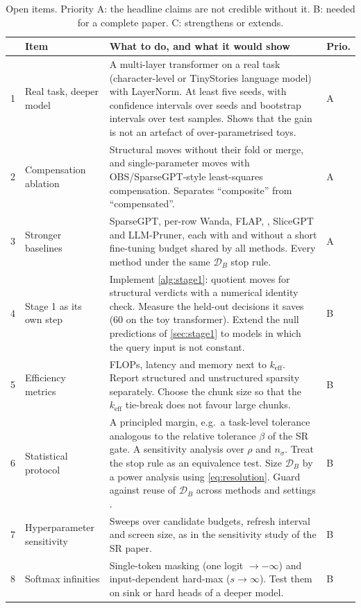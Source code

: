 \documentclass[11pt,a4paper]{article}
\theoremstyle{definition}
\newcommand{\D}{\mathcal{D}}
\newcommand{\keff}{k_{\mathrm{eff}}}
\newcommand{\DB}{\D_{B}}
\begin{document}
\begin{table}[htbp]
\centering\footnotesize
\caption{Open items. Priority A: the headline claims are not credible without it.
B: needed for a complete paper. C: strengthens or extends.}
\label{tab:outlook}
\renewcommand{\arraystretch}{1.25}
\begin{tabularx}{\textwidth}{@{}p{0.4cm}p{3.6cm}Xp{1.0cm}@{}}
\toprule
& \textbf{Item} & \textbf{What to do, and what it would show} & \textbf{Prio.}\\
\midrule
1 & Real task, deeper model & A multi-layer transformer on a real task (character-level or TinyStories language model) with LayerNorm. At least five seeds, with confidence intervals over seeds and bootstrap intervals over test samples. Shows that the gain is not an artefact of over-parametrised toys. & A\\
2 & Compensation ablation & Structural moves without their fold or merge, and single-parameter moves with OBS/SparseGPT-style least-squares compensation. Separates ``composite'' from ``compensated''. & A\\
3 & Stronger baselines & SparseGPT, per-row Wanda, FLAP, \citet{kwon2022fast}, SliceGPT and LLM-Pruner, each with and without a short fine-tuning budget shared by all methods. Every method under the same $\DB$ stop rule. & A\\
4 & Stage 1 as its own step & Implement \cref{alg:stage1}: quotient moves for structural verdicts with a numerical identity check. Measure the held-out decisions it saves (60 on the toy transformer). Extend the null predictions of \cref{sec:stage1} to models in which the query input is not constant. & B\\
5 & Efficiency metrics & FLOPs, latency and memory next to $\keff$. Report structured and unstructured sparsity separately. Choose the chunk size so that the $\keff$ tie-break does not favour large chunks. & B\\
6 & Statistical protocol & A principled margin, e.g.\ a task-level tolerance analogous to the relative tolerance $\beta$ of the SR gate. A sensitivity analysis over $\rho$ and $n_\sigma$. Treat the stop rule as an equivalence test. Size $\DB$ by a power analysis using \eqref{eq:resolution}. Guard against reuse of $\DB$ across methods and settings \citep{dwork2015reusable}. & B\\
7 & Hyperparameter sensitivity & Sweeps over candidate budgets, refresh interval and screen size, as in the sensitivity study of the SR paper. & B\\
8 & Softmax infinities & Single-token masking (one logit $\to-\infty$) and input-dependent hard-max ($s\to\infty$). Test them on sink or hard heads of a deeper model. & B\\

\end{tabularx}
\end{table}
\end{document}
